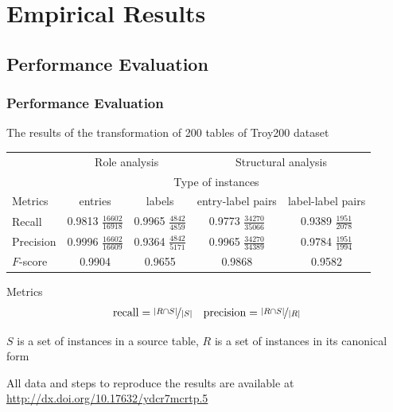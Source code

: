 \documentclass{beamer}
\begin{document}

\section{Empirical Results}

\subsection{Performance Evaluation}

\begin{frame}
\frametitle{Performance Evaluation}

\small{The results of the transformation of 200 tables of Troy200 dataset \cite{Nagy2016}}

\footnotesize{
\begin{table}
		\centering
		    \bgroup
        \def\arraystretch{1.5}
				\begin{tabular}{|l|c|c|c|c|}
						\hline
														& \multicolumn{2}{|c|}{Role analysis} & \multicolumn{2}{|c|}{Structural analysis} \\
														\cline{2-5}
														& \multicolumn{4}{|c|}{Type of instances} \\
														\cline{2-5}
			            Metrics   & entries                      & labels                     & entry-label pairs            & label-label pairs  \\
			      \hline
			            Recall    & 0.9813 $\frac{16602}{16918}$ & 0.9965 $\frac{4842}{4859}$ & 0.9773 $\frac{34270}{35066}$ & 0.9389 $\frac{1951}{2078}$ \\
			            Precision & 0.9996 $\frac{16602}{16609}$ & 0.9364 $\frac{4842}{5171}$ & 0.9965 $\frac{34270}{34389}$ & 0.9784 $\frac{1951}{1994}$ \\
									$F$-score & 0.9904                       & 0.9655                     & 0.9868                       & 0.9582                     \\
			      \hline
		    \end{tabular}
				\egroup
\end{table}
}

\begin{block}{\small Metrics}
\footnotesize{
\begin{equation*}
\begin{aligned}[c]
\mbox{recall} = \nicefrac{\left|R \cap S\right|}{\left|S\right|}
\end{aligned}
\quad
\begin{aligned}[c]
\mbox{precision} = \nicefrac{\left|R \cap S\right|}{\left|R\right|}
\end{aligned}
\end{equation*}
}
\scriptsize{\centerline{$S$ is a set of instances in a source table, $R$ is a set of instances in its canonical form}}
\end{block}

\tiny All data and steps to reproduce the results are available at \url{http://dx.doi.org/10.17632/ydcr7mcrtp.5}

\end{frame}
\end{document}
